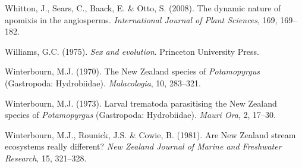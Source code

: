 \documentclass[
  letterpaper,
]{book}
\newlength{\cslhangindent}
\newenvironment{CSLReferences}[2] %
 {\begin{list}{}{%
  \setlength{\itemindent}{0pt}
  \setlength{\leftmargin}{0pt}
  \setlength{\parsep}{0pt}
  \ifodd #1
   \setlength{\leftmargin}{\cslhangindent}
   \setlength{\itemindent}{-1\cslhangindent}
  \fi
  \setlength{\itemsep}{#2\baselineskip}}}
 {\end{list}}
\begin{document}
\begin{CSLReferences}{1}{0}
Whitton, J., Sears, C., Baack, E. \& Otto, S. (2008). The dynamic nature
of apomixis in the angiosperms. \emph{International Journal of Plant
Sciences}, 169, 169--182.

Williams, G.C. (1975). \emph{Sex and evolution}. Princeton University
Press.

Winterbourn, M.J. (1970). The {New Zealand} species of
\emph{{P}otamopyrgus} ({G}astropoda: {H}ydrobiidae). \emph{Malacologia},
10, 283--321.

Winterbourn, M.J. (1973). Larval trematoda parasitising the {New
Zealand} species of \emph{{P}otamopyrgus} ({G}astropoda: {H}ydrobiidae).
\emph{Mauri Ora}, 2, 17--30.

Winterbourn, M.J., Rounick, J.S. \& Cowie, B. (1981). Are {New Zealand}
stream ecosystems really different? \emph{New Zealand Journal of Marine
and Freshwater Research}, 15, 321--328.

\end{CSLReferences}


\backmatter
\end{document}
